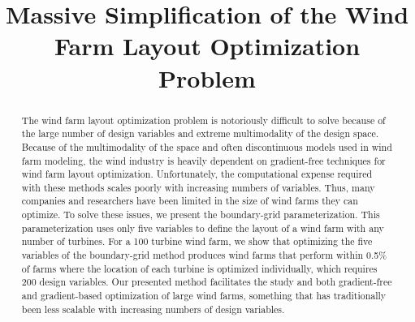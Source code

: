 \documentclass[wes, manuscript]{copernicus}
\begin{document}
\title{Massive Simplification of the Wind Farm Layout Optimization Problem}











\received{}
\pubdiscuss{} %
\revised{}
\accepted{}
\published{}




\maketitle



\begin{abstract}
The wind farm layout optimization problem is notoriously difficult to solve because of the large number of design variables and extreme multimodality of the design space. 
Because of the multimodality of the space and often discontinuous models used in wind farm modeling, the wind industry is heavily dependent on gradient-free techniques for wind farm layout optimization. 
Unfortunately, the computational expense required with these methods scales poorly with increasing numbers of variables. Thus, many companies and researchers have been limited in the size of wind farms they can optimize.
To solve these issues, we present the boundary-grid parameterization. This parameterization uses only five variables to define the layout of a wind farm with any number of turbines. For a 100 turbine wind farm, we show that optimizing the five variables of the boundary-grid method produces wind farms that perform within 0.5\% of farms where the location of each turbine is optimized individually, which requires 200 design variables. Our presented method facilitates the study and both gradient-free and gradient-based optimization of large wind farms, something that has traditionally been less scalable with increasing numbers of design variables.
\end{abstract}
\end{document}
